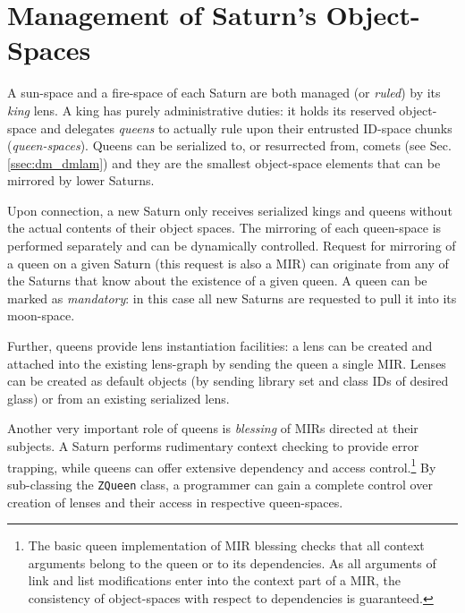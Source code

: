 \documentclass[final]{siamltex}
\def\smalltt#1{{\small\texttt{#1}}}
\begin{document}

\section{Management of Saturn's Object-Spaces}
\label{sec:saturn_os_management}

A sun-space and a fire-space of each Saturn are both managed (or
\emph{ruled}) by its \emph{king} lens. A king has purely
administrative duties: it holds its reserved object-space and
delegates \emph{queens} to actually rule upon their entrusted ID-space
chunks (\emph{queen-spaces}). Queens can be serialized to, or
resurrected from, comets (see Sec.\,\ref{ssec:dm_dmlam}) and they are
the smallest object-space elements that can be mirrored by lower
Saturns.

Upon connection, a new Saturn only receives serialized kings and
queens without the actual contents of their object spaces. The
mirroring of each queen-space is performed separately and can be
dynamically controlled. Request for mirroring of a queen on a given
Saturn (this request is also a MIR) can originate from any of the
Saturns that know about the existence of a given queen. A queen can be
marked as \emph{mandatory}: in this case all new Saturns are requested
to pull it into its moon-space.

Further, queens provide lens instantiation facilities: a lens can be
created and attached into the existing lens-graph by sending the queen
a single MIR. Lenses can be created as default objects (by sending
library set and class IDs of desired glass) or from an existing
serialized lens.

Another very important role of queens is \emph{blessing} of MIRs
directed at their subjects. A Saturn performs rudimentary context
checking to provide error trapping, while queens can offer extensive
dependency and access
control.\footnote{%
  The basic queen implementation of MIR blessing checks that all
  context arguments belong to the queen or to its dependencies. As all
  arguments of link and list modifications enter into the context part
  of a MIR, the consistency of object-spaces with respect to
  dependencies is guaranteed.} %
By sub-classing the \smalltt{ZQueen} class, a programmer can gain a
complete control over creation of lenses and their access in
respective queen-spaces.
\end{document}
